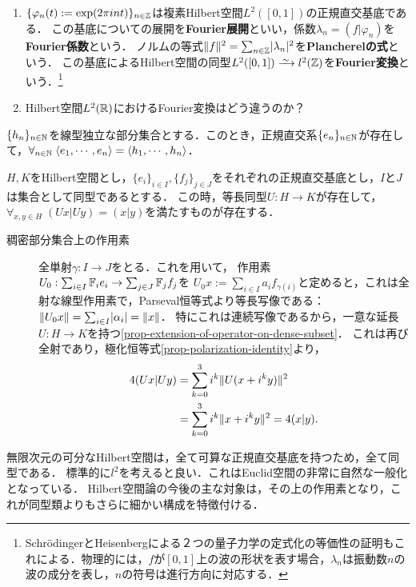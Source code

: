 \documentclass[uplatex,dvipdfmx]{jsreport}
\begin{document}
\begin{example}\mbox{}
    \begin{enumerate}
        \item $\{\varphi_n(t):=\exp(2\pi int)\}_{n\in\mathbb{Z}}$は複素Hilbert空間$L^2([0,1])$の正規直交基底である．
        この基底についての展開を\textbf{Fourier展開}といい，係数$\lambda_n=(f|\varphi_n)$を\textbf{Fourier係数}という．
        ノルムの等式$\|f\|^2=\sum_{n\in\mathbb{Z}}\lvert\lambda_n\rvert^2$を\textbf{Plancherelの式}という．
        この基底によるHilbert空間の同型$L^2([0,1])\iso l^2(\Z)$を\textbf{Fourier変換}という．\footnote{SchrödingerとHeisenbergによる２つの量子力学の定式化の等価性の証明もこれによる．物理的には，$f$が$[0,1]$上の波の形状を表す場合，$\lambda_n$は振動数$n$の波の成分を表し，$n$の符号は進行方向に対応する．}
        \item Hilbert空間$L^2(\mathbb{R})$におけるFourier変換はどう違うのか？
    \end{enumerate}
\end{example}

\begin{theorem}
    $\{h_n\}_{n\in\mathbb{N}}$を線型独立な部分集合とする．このとき，正規直交系$\{e_n\}_{n\in\mathbb{N}}$が存在して，$\forall_{n\in\mathbb{N}}\;\langle e_1,\cdots,e_n\rangle=\langle h_1,\cdots,h_n\rangle$．
\end{theorem}

\begin{proposition}[Hilbert空間の同型類]\label{prop-characterization-of-isomorphism-of-Hilbert-spaces}
    $H,K$をHilbert空間とし，$\{e_i\}_{i\in I},\{f_j\}_{j\in J}$をそれぞれの正規直交基底とし，$I$と$J$は集合として同型であるとする．
    この時，等長同型$U:H\to K$が存在して，$\forall_{x,y\in H}\;(Ux|Uy)=(x|y)$を満たすものが存在する．
\end{proposition}
\begin{Proof}\mbox{}
    \begin{description}
        \item[稠密部分集合上の作用素] 全単射$\gamma:I\to J$をとる．これを用いて，
        作用素$U_0:\sum_{i\in I}\mathbb{F}_ie_i\to\sum_{j\in J}\mathbb{F}_jf_j$を
        $U_0x:=\sum_{i\in I}a_if_{\gamma(i)}$と定めると，これは全射な線型作用素で，Parseval恒等式より等長写像である：$\|U_0x\|=\sum_{i\in I}\lvert\alpha_i\rvert=\|x\|$．
        特にこれは連続写像であるから，一意な延長$U:H\to K$を持つ\ref{prop-extension-of-operator-on-dense-subset}．
        これは再び全射であり，極化恒等式\ref{prop-polarization-identity}より，
        \begin{align*}
            4(Ux|Uy)&=\sum_{k=0}^3i^k\|U(x+i^ky)\|^2\\
            &=\sum_{k=0}^3i^k\|x+i^ky\|^2=4(x|y).
        \end{align*}
    \end{description}
\end{Proof}
\begin{remarks}
    無限次元の可分なHilbert空間は，全て可算な正規直交基底を持つため，全て同型である．
    標準的に$l^2$を考えると良い．これはEuclid空間の非常に自然な一般化となっている．
    Hilbert空間論の今後の主な対象は，その上の作用素となり，これが同型類よりもさらに細かい構成を特徴付ける．
\end{remarks}
\end{document}
